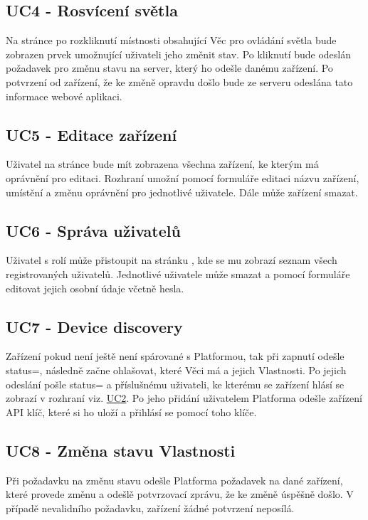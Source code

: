 \documentclass[thesis=B,czech]{FITthesis}[2019/12/23]
\begin{document}
\subsection{UC4 - Rosvícení světla}
Na stránce  po rozkliknutí místnosti obsahující Věc pro ovládání světla  bude zobrazen prvek umožnující uživateli jeho změnit stav. Po kliknutí bude odeslán požadavek pro změnu stavu na server, který ho odešle danému zařízení. Po potvrzení od zařízení, že ke změně opravdu došlo bude ze serveru odeslána tato informace webové aplikaci.

\subsection{UC5 - Editace zařízení}
Uživatel na stránce  bude mít zobrazena všechna zařízení, ke kterým má oprávnění pro editaci. Rozhraní umožní pomocí formuláře editaci názvu zařízení, umístění a změnu oprávnění pro jednotlivé uživatele. Dále může zařízení smazat.

\subsection{UC6 - Správa uživatelů}
Uživatel s rolí  může přistoupit na stránku , kde se mu zobrazí seznam všech registrovaných uživatelů. Jednotlivé uživatele může smazat a pomocí formuláře editovat jejich osobní údaje včetně hesla.

\subsection{UC7 - Device discovery}
Zařízení pokud není ještě není spárované s Platformou, tak při zapnutí odešle status=, následně začne ohlašovat, které Věci má a jejich Vlastnosti. Po jejich odeslání pošle status= a příslušnému uživateli, ke kterému se zařízení hlásí se zobrazí v rozhraní viz. \hyperref[UC:UC2]{UC2}. Po jeho přidání uživatelem Platforma odešle zařízení API klíč, které si ho uloží a přihlásí se pomocí toho klíče.

\subsection{UC8 - Změna stavu Vlastnosti}
Při požadavku na změnu stavu  odešle Platforma požadavek na dané zařízení, které provede změnu a odešlě potvrzovací zprávu, že ke změně úspěšně došlo. V případě nevalidního požadavku, zařízení žádné potvrzení neposílá.
\end{document}
